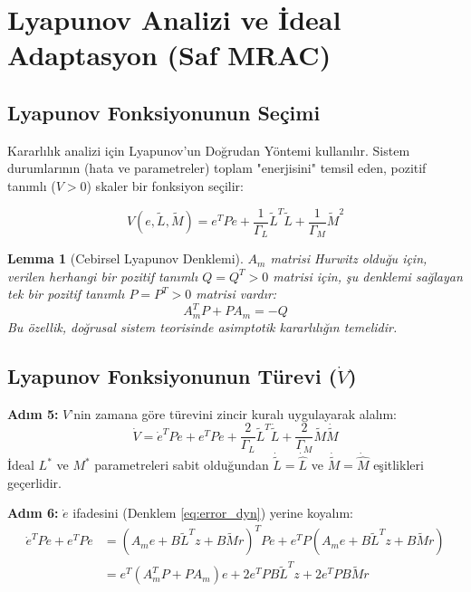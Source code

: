 \documentclass[12pt,a4paper]{article}
\newtheorem{lemma}{Lemma}
\begin{document}
\section{Lyapunov Analizi ve İdeal Adaptasyon (Saf MRAC)}

\subsection{Lyapunov Fonksiyonunun Seçimi}
Kararlılık analizi için Lyapunov'un Doğrudan Yöntemi kullanılır. Sistem durumlarının (hata ve parametreler) toplam "enerjisini" temsil eden, pozitif tanımlı ($V > 0$) skaler bir fonksiyon seçilir:

\begin{equation}
    V(e, \tilde{L}, \tilde{M}) = e^T P e + \frac{1}{\Gamma_L} \tilde{L}^T \tilde{L} + \frac{1}{\Gamma_M} \tilde{M}^2
    \label{eq:lyapunov}
\end{equation}

\begin{lemma}[Cebirsel Lyapunov Denklemi]
$A_m$ matrisi Hurwitz olduğu için, verilen herhangi bir pozitif tanımlı $Q = Q^T > 0$ matrisi için, şu denklemi sağlayan tek bir pozitif tanımlı $P = P^T > 0$ matrisi vardır:
\begin{equation}
    A_m^T P + P A_m = -Q
\end{equation}
Bu özellik, doğrusal sistem teorisinde asimptotik kararlılığın temelidir.
\end{lemma}

\subsection{Lyapunov Fonksiyonunun Türevi ($\dot{V}$)}
\textbf{Adım 5:} $V$'nin zamana göre türevini zincir kuralı uygulayarak alalım:
\begin{equation}
    \dot{V} = \dot{e}^T P e + e^T P \dot{e} + \frac{2}{\Gamma_L} \tilde{L}^T \dot{\tilde{L}} + \frac{2}{\Gamma_M} \tilde{M} \dot{\tilde{M}}
\end{equation}
İdeal $L^*$ ve $M^*$ parametreleri sabit olduğundan $\dot{\tilde{L}} = \dot{\hat{L}}$ ve $\dot{\tilde{M}} = \dot{\hat{M}}$ eşitlikleri geçerlidir. 

\textbf{Adım 6:} $\dot{e}$ ifadesini (Denklem \ref{eq:error_dyn}) yerine koyalım:
\begin{align}
    \dot{e}^T P e + e^T P \dot{e} &= (A_m e + B \tilde{L}^T z + B \tilde{M} r)^T P e + e^T P (A_m e + B \tilde{L}^T z + B \tilde{M} r) \nonumber \\
    &= e^T (A_m^T P + P A_m) e + 2 e^T P B \tilde{L}^T z + 2 e^T P B \tilde{M} r
\end{align}
\end{document}
